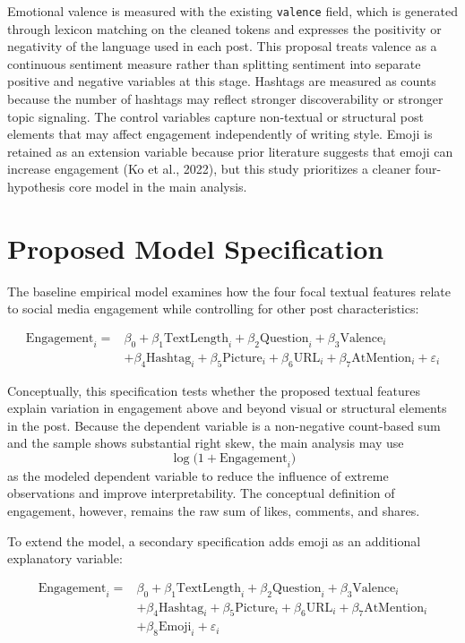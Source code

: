 \documentclass[12pt,a4paper]{ctexart}
\begin{document}
Emotional valence is measured with the existing \texttt{valence} field, which is generated through lexicon matching on the cleaned tokens and expresses the positivity or negativity of the language used in each post. This proposal treats valence as a continuous sentiment measure rather than splitting sentiment into separate positive and negative variables at this stage. Hashtags are measured as counts because the number of hashtags may reflect stronger discoverability or stronger topic signaling. The control variables capture non-textual or structural post elements that may affect engagement independently of writing style. Emoji is retained as an extension variable because prior literature suggests that emoji can increase engagement (Ko et al., 2022), but this study prioritizes a cleaner four-hypothesis core model in the main analysis.

\section{Proposed Model Specification}
The baseline empirical model examines how the four focal textual features relate to social media engagement while controlling for other post characteristics:

\begin{equation}
\begin{aligned}
\text{Engagement}_i = {}& \beta_0 + \beta_1\text{TextLength}_i + \beta_2\text{Question}_i + \beta_3\text{Valence}_i \\
& + \beta_4\text{Hashtag}_i + \beta_5\text{Picture}_i + \beta_6\text{URL}_i + \beta_7\text{AtMention}_i + \varepsilon_i
\end{aligned}
\end{equation}

Conceptually, this specification tests whether the proposed textual features explain variation in engagement above and beyond visual or structural elements in the post. Because the dependent variable is a non-negative count-based sum and the sample shows substantial right skew, the main analysis may use
\[
\log\bigl(1 + \text{Engagement}_i\bigr)
\]
as the modeled dependent variable to reduce the influence of extreme observations and improve interpretability. The conceptual definition of engagement, however, remains the raw sum of likes, comments, and shares.

To extend the model, a secondary specification adds emoji as an additional explanatory variable:

\begin{equation}
\begin{aligned}
\text{Engagement}_i = {}& \beta_0 + \beta_1\text{TextLength}_i + \beta_2\text{Question}_i + \beta_3\text{Valence}_i \\
& + \beta_4\text{Hashtag}_i + \beta_5\text{Picture}_i + \beta_6\text{URL}_i + \beta_7\text{AtMention}_i \\
& + \beta_8\text{Emoji}_i + \varepsilon_i
\end{aligned}
\end{equation}
\end{document}
